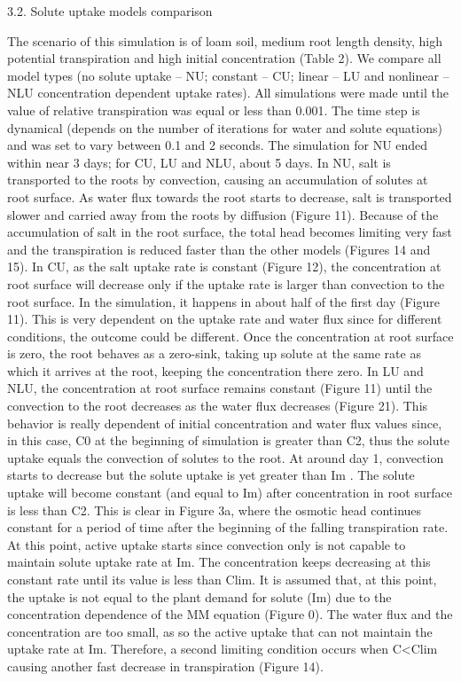 3.2. Solute uptake models comparison

The scenario of this simulation is of loam soil, medium root length density, high potential transpiration and high initial concentration (Table 2). We compare all model types (no solute uptake – NU; constant – CU; linear – LU and nonlinear – NLU concentration dependent uptake rates). All simulations were made until the value of relative transpiration was equal or less than 0.001. The time step is dynamical (depends on the number of iterations for water and solute equations) and was set to vary between 0.1 and 2 seconds. The simulation for NU ended within near 3 days; for CU, LU and NLU, about 5 days.
In NU, salt is transported to the roots by convection, causing an accumulation of solutes at root surface. As water flux towards the root starts to decrease, salt is transported slower and carried away from the roots by diffusion (Figure 11). Because of the accumulation of salt in the root surface, the total head becomes limiting very fast and the transpiration is reduced faster than the other models (Figures 14 and 15).
In CU, as the salt uptake rate is constant (Figure 12), the concentration at root surface will decrease only if the uptake rate is larger than convection to the root surface. In the simulation, it happens in about half of the first day (Figure 11). This is very dependent on the uptake rate and water flux since for different conditions, the outcome could be different. Once the concentration at root surface is zero, the root behaves as a zero-sink, taking up solute at the same rate as which it arrives at the root, keeping the concentration there zero.
In LU and NLU, the concentration at root surface remains constant (Figure 11) until the convection to the root decreases as the water flux decreases (Figure 21). This behavior is really dependent of initial concentration and water flux values since, in this case, C0 at the beginning of simulation is greater than C2, thus the solute uptake equals the convection of solutes to the root. At around day 1, convection starts to decrease but the solute uptake is yet greater than Im . The solute uptake will become constant (and equal to Im) after concentration in root surface is less than C2. This is clear in Figure 3a, where the osmotic head continues constant for a period of time after the beginning of the falling transpiration rate. At this point, active uptake starts since convection only is not capable to maintain solute uptake rate at Im. The concentration keeps decreasing at this constant rate until its value is less than Clim. It is assumed that, at this point, the uptake is not equal to the plant demand for solute (Im) due to the concentration dependence of the MM equation (Figure 0). The water flux and the concentration are too small, as so the active uptake that can not maintain the uptake rate at Im. Therefore, a second limiting condition occurs when C<Clim causing another fast decrease in transpiration (Figure 14).

